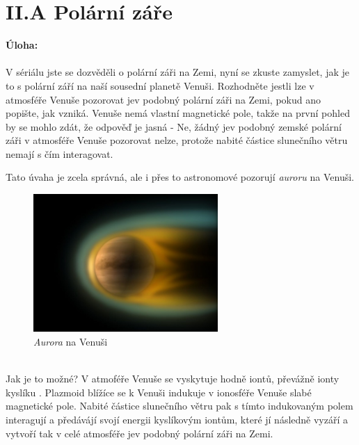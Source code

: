 \documentclass{../../../../style/mkimain}
\begin{document}
\section*{II.A Polární záře}
\noindent \textbf{Úloha:}
\\
\\
V sériálu jste se dozvěděli o polární záři na Zemi, nyní se zkuste zamyslet, jak je to s polární září na naší 
sousední planetě Venuši. Rozhodněte jestli lze v atmosféře Venuše pozorovat jev podobný polární záři na Zemi, pokud ano popište, jak vzniká.
\klein
Venuše nemá vlastní magnetické pole, takže na první pohled by se mohlo zdát, že odpověď je jasná - Ne, žádný jev podobný zemské polární záři v 
atmosféře Venuše pozorovat nelze, protože nabité částice slunečního větru nemají s čím interagovat.

Tato úvaha je zcela správná, ale i přes to astronomové pozorují \emph{auroru} na Venuši.
\begin{figure}[htpb]
    \begin{center}
    \includegraphics[width=7cm]{images/venus-aurora.jpg}
    \\
    \emph{Aurora} na Venuši\footnotemark
    \end{center}
\end{figure}
\\ Jak je to možné? V atmoféře Venuše se vyskytuje hodně iontů, převážně ionty kyslíku . Plazmoid blížíce se k Venuši indukuje v 
ionosféře Venuše slabé magnetické pole. Nabité částice slunečního větru pak s tímto indukovaným polem interagují a předávájí svojí energii 
kyslíkovým iontům, které jí následně vyzáří a vytvoří tak v celé atmosféře jev podobný polární záři na Zemi. 
\end{document}
